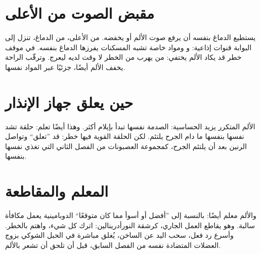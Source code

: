 \section*{مقبض الصوت من الأعلى}

يستطيع الدماغ بنفسه أن يرفع صوت الألم أو يخفضه. من الأعلى، من الدماغ، تنزل إلى البوابة قنوات إذاعية:  و ومواد خاصة تشبه المسكنات يفرزها الدماغ بنفسه. في موقف خطر قد يكاد الألم يختفي: من يهرب من الخطر لا وقت لديه ليعرج. وترقّب الراحة يخفف الألم أيضًا، جزئيًا عبر المواد نفسها.

\section*{حين يعلق جهاز الإنذار}

الألم المتكرر يزيد الحساسية: الصدمة نفسها تبدأ بإيلام أكثر. وهذا أيضًا تعلم: حلقة تشد نفسها بنفسها ما دام الجرح يلتئم. لكن الحلقة القوية فيها خطر: قد ”تعلق“ وتواصل الرنين بعد أن يلتئم الجرح، كمجموعة العصبونات من الفصل الثاني التي تغذي نفسها بنفسها.

\section*{المعلم والمقاطعة}

والألم معلم أيضًا: بالنسبة إلى ”أفضل أو أسوأ مما كان متوقعًا“ الدوبامينية يعمل مكافأة سالبة. وهو يقاطع العمل الجاري، كرشقة النورأدرينالين: اترك كل شيء، واهتم بالخطر. وأسرع رد فعل، سحب اليد عن الساخن، يُغلق مباشرة في الحبل الشوكي بزوج العضلات المتضادة نفسه من الفصل السابق، قبل أن تلحق أن تشعر بالألم.

